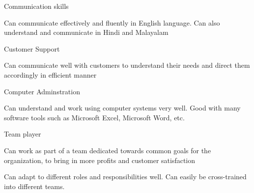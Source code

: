 

\begin{cventries}

  \cventry
    {} %
    {Communication skills} %
    {} %
    {} %
    {
      \begin{cvitems} %
        \item {Can communicate effectively and fluently in English language. Can also understand and communicate in Hindi and Malayalam}
      \end{cvitems}
    }

  \cventry
    {} %
    {Customer Support} %
    {} %
    {} %
    {
      \begin{cvitems} %
        \item {Can communicate well with customers to understand their needs and direct them accordingly in efficient manner}
      \end{cvitems}
    }

\cventry
{} %
{Computer Adminstration} %
{} %
{} %
{
	\begin{cvitems} %
		\item { Can understand and work using computer systems very well. Good with many software tools such as Microsoft Excel, Microsoft Word, etc.}
	\end{cvitems}
}

\cventry
{} %
{Team player } %
{} %
{} %
{
	\begin{cvitems} %
		\item { Can work as part of a team dedicated towards common goals for the organization, to bring in more profits and customer satisfaction}
		\item { Can adapt to different roles and responsibilities well. Can easily be cross-trained into different teams.}
	\end{cvitems}
}

\end{cventries}
